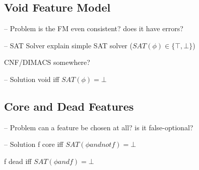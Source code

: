






\subsection{Void Feature Model}
\begin{frame}{-- Problem}
    is the FM even consistent? does it have errors?
\end{frame}
\begin{frame}{-- SAT Solver}
    explain simple SAT solver ($SAT(\phi) \in \{\top, \bot\}$)

    CNF/DIMACS somewhere?
\end{frame}
\begin{frame}{-- Solution}
    void iff $SAT(\phi) = \bot$
\end{frame}

\subsection{Core and Dead Features}
\begin{frame}{-- Problem}
    can a feature be chosen at all? is it false-optional?
\end{frame}
\begin{frame}{-- Solution}
    f core iff $SAT(\phi and not f) = \bot$
    
    f dead iff $SAT(\phi and f) = \bot$
\end{frame}

